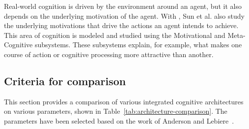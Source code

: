 Real-world cognition is driven by the environment around an agent, but
it also depends on the underlying motivation of the agent. With
\clarion, Sun et al. also study the underlying motivations that drive
the actions an agent intends to achieve. This area of cognition is
modeled and studied using the Motivational and Meta-Cognitive
subsystems.  These subsystems explain, for example, what makes one
course of action or cognitive processing more attractive than another.

\subsection{Criteria for comparison}
This section provides a comparison of various integrated cognitive
architectures on various parameters, shown in
Table~\ref{tab:architecture-comparison}. The parameters have been
selected based on the work of Anderson and
Lebiere~\cite{CambridgeJournals:207162}.


